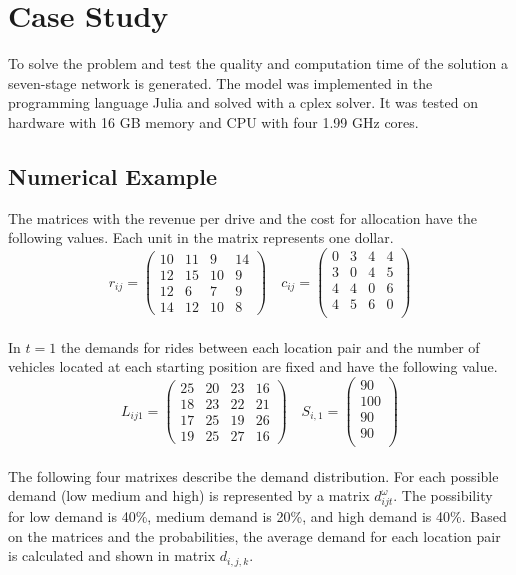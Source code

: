 \section{Case Study}
To solve the problem and test the quality and computation time of the solution a seven-stage network is generated. The model was implemented in the programming language Julia and solved with a cplex solver. It was tested on hardware with 16 GB memory and CPU with four 1.99 GHz cores.
\subsection{Numerical Example}
The matrices with the revenue per drive and the cost for allocation have the following values. Each unit in the matrix represents one dollar.
\\
\begin{equation*}
r_{i j} =
\begin{pmatrix}
10&11& 9& 14\\
12& 15& 10& 9\\
12& 6 & 7 &9\\
14 &12 &10& 8
\end{pmatrix}
\quad
c_{i j} =
\begin{pmatrix}
0& 3& 4& 4\\
3 &0 &4 &5\\
4 &4& 0& 6\\
4& 5& 6& 0\\
\end{pmatrix}
\end{equation*}
\\
In $t=1$ the demands for rides between each location pair and the number of vehicles located at each starting position are fixed and have the following value.
\begin{equation*}
L_{i j 1} =
\begin{pmatrix}
25 &20& 23& 16\\
18& 23& 22& 21\\
17&25& 19& 26\\
19&25& 27& 16
\end{pmatrix}
\quad
S_{i,1}=
\begin{pmatrix}
90\\
100\\
90\\
90\\
\end{pmatrix}
\end{equation*}
\\
The following four matrixes describe the demand distribution. For each possible demand (low medium and high) is represented by a matrix $d_{i j t}^{\omega}$. The possibility for low demand is 40\%, medium demand is 20\%, and high demand is 40\%. Based on the matrices and the probabilities, the average demand for each location pair is calculated and shown in matrix $d_{i,j,k}$.
